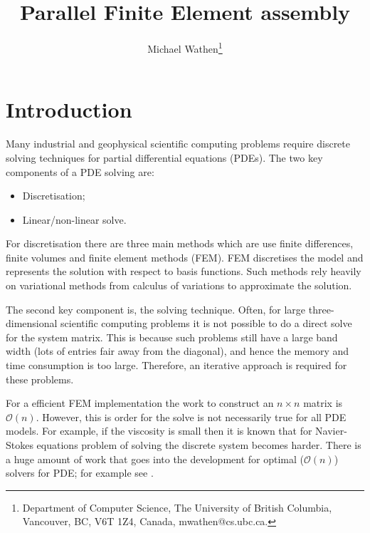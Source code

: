 \documentclass[10pt]{article}
\title{Parallel Finite Element assembly}
\author{
 Michael Wathen\thanks{Department of Computer Science,
The University of British Columbia, Vancouver, BC, V6T 1Z4, Canada,
 mwathen@cs.ubc.ca.}
}
\begin{document}
\maketitle





\section{Introduction}

Many industrial and geophysical scientific computing problems require discrete solving techniques for partial differential equations (PDEs). The two key components of a PDE solving are:
\begin{itemize}
    \item Discretisation;
    \item Linear/non-linear solve.
\end{itemize}
For discretisation there are three main methods which are use finite differences, finite volumes and finite element methods (FEM). FEM discretises the model and represents the solution with respect to basis functions. Such methods rely heavily on variational methods from calculus of variations to approximate the solution.

The second key component is, the solving technique. Often, for large three-dimensional scientific computing problems it is not possible to do a direct solve for the system matrix. This is because such problems still have a large band width (lots of entries fair away from the diagonal), and hence the memory and time consumption is too large. Therefore, an iterative approach is required for these problems.

For a efficient FEM implementation the work to construct an $n\times n$ matrix is $\mathcal{O}(n)$. However, this is order for the solve is not necessarily true for all PDE models. For example, if the viscosity is small then it is known that for Navier-Stokes equations problem of solving the discrete system becomes harder. There is a huge amount of work that goes into the development for optimal ($\mathcal{O}(n)$) solvers for PDE; for example see \cite{bosch2014fast,elman2014finite,greif2007preconditioners}.
\end{document}
